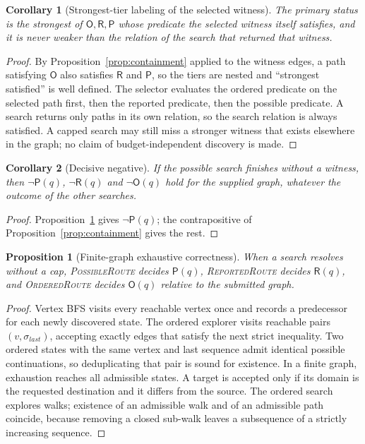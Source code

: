 \documentclass[11pt,letterpaper]{article}
\newtheorem{proposition}{Proposition}
\newtheorem{corollary}{Corollary}
\newcommand{\OO}{\mathsf{O}}
\newcommand{\RR}{\mathsf{R}}
\newcommand{\PP}{\mathsf{P}}
\begin{document}
\begin{corollary}[Strongest-tier labeling of the selected witness]\label{cor:label}
The primary status is the strongest of \(\OO,\RR,\PP\) whose predicate the selected witness itself satisfies, and it is never weaker than the relation of the search that returned that witness.
\end{corollary}
\begin{proof}
By Proposition~\ref{prop:containment} applied to the witness edges, a path satisfying \(\OO\) also satisfies \(\RR\) and \(\PP\), so the tiers are nested and ``strongest satisfied'' is well defined. The selector evaluates the ordered predicate on the selected path first, then the reported predicate, then the possible predicate. A search returns only paths in its own relation, so the search relation is always satisfied. A capped search may still miss a stronger witness that exists elsewhere in the graph; no claim of budget-independent discovery is made.
\end{proof}

\begin{corollary}[Decisive negative]\label{cor:negative}
If the possible search finishes without a witness, then \(\neg\PP(q)\), \(\neg\RR(q)\) and \(\neg\OO(q)\) hold for the supplied graph, whatever the outcome of the other searches.
\end{corollary}
\begin{proof}
Proposition~\ref{prop:exhaustive} gives \(\neg\PP(q)\); the contrapositive of Proposition~\ref{prop:containment} gives the rest.
\end{proof}

\begin{proposition}[Finite-graph exhaustive correctness]\label{prop:exhaustive}
When a search resolves without a cap, \textup{\textsc{PossibleRoute}} decides \(\PP(q)\), \textup{\textsc{ReportedRoute}} decides \(\RR(q)\), and \textup{\textsc{OrderedRoute}} decides \(\OO(q)\) relative to the submitted graph.
\end{proposition}
\begin{proof}
Vertex BFS visits every reachable vertex once and records a predecessor for each newly discovered state. The ordered explorer visits reachable pairs \((v,\sigma_{last})\), accepting exactly edges that satisfy the next strict inequality. Two ordered states with the same vertex and last sequence admit identical possible continuations, so deduplicating that pair is sound for existence. In a finite graph, exhaustion reaches all admissible states. A target is accepted only if its domain is the requested destination and it differs from the source. The ordered search explores walks; existence of an admissible walk and of an admissible path coincide, because removing a closed sub-walk leaves a subsequence of a strictly increasing sequence.
\end{proof}
\end{document}
